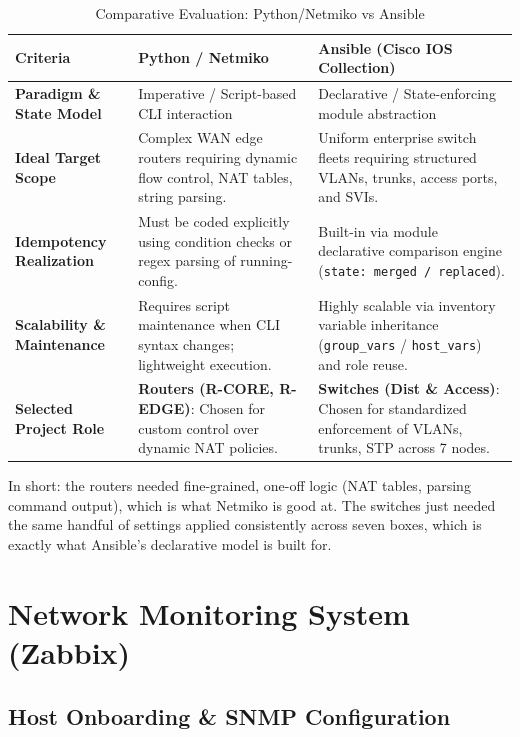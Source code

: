 \documentclass[11pt,a4paper]{article}
\newcommand{\hr}{\vspace{0.2cm}\noindent\hrulefill\vspace{0.2cm}}
\begin{document}
\begin{table}[htbp]
\centering
\caption{Comparative Evaluation: Python/Netmiko vs Ansible}
\label{tab:automation_comp}
\small
\begin{tabularx}{\textwidth}{@{}l L L@{}}
\toprule
\textbf{Criteria} & \textbf{Python / Netmiko} & \textbf{Ansible (Cisco IOS Collection)} \\
\midrule
\textbf{Paradigm \& State Model} & Imperative / Script-based CLI interaction & Declarative / State-enforcing module abstraction \\
\midrule
\textbf{Ideal Target Scope} & Complex WAN edge routers requiring dynamic flow control, NAT tables, string parsing. & Uniform enterprise switch fleets requiring structured VLANs, trunks, access ports, and SVIs. \\
\midrule
\textbf{Idempotency Realization} & Must be coded explicitly using condition checks or regex parsing of running-config. & Built-in via module declarative comparison engine (\texttt{state: merged / replaced}). \\
\midrule
\textbf{Scalability \& Maintenance} & Requires script maintenance when CLI syntax changes; lightweight execution. & Highly scalable via inventory variable inheritance (\texttt{group\_vars} / \texttt{host\_vars}) and role reuse. \\
\midrule
\textbf{Selected Project Role} & \textbf{Routers (R-CORE, R-EDGE)}: Chosen for custom control over dynamic NAT policies. & \textbf{Switches (Dist \& Access)}: Chosen for standardized enforcement of VLANs, trunks, STP across 7 nodes. \\
\bottomrule
\end{tabularx}
\end{table}

In short: the routers needed fine-grained, one-off logic (NAT tables, parsing command output), which is what Netmiko is good at. The switches just needed the same handful of settings applied consistently across seven boxes, which is exactly what Ansible's declarative model is built for.

\hr

\section{Network Monitoring System (Zabbix)}

\subsection{Host Onboarding \& SNMP Configuration}
\end{document}
